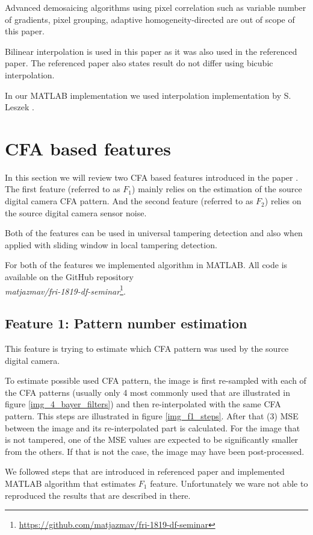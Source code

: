 \documentclass{template/acm_proc_article-sp}
\begin{document}
Advanced demosaicing algorithms using pixel correlation such as 
variable number of gradients, pixel grouping, adaptive homogeneity-directed
are out of scope of this paper.

Bilinear interpolation is used in this paper as it was also used in
the referenced paper. The referenced paper also states result do not
differ using bicubic interpolation.

In our MATLAB implementation we used interpolation implementation by S. Leszek \cite{cfainterpolation2009}.

\newpage
\section{CFA based features}
In this section we will review two CFA based features introduced in the paper \cite{dirik2009image}. The first feature (referred to as  $F_1$) mainly relies on the estimation of the source digital camera CFA pattern. And the second feature (referred to as $F_2$) relies on the source digital camera sensor noise.

Both of the features can be used in universal tampering detection and also when applied with sliding window in local tampering detection.

For both of the features we implemented algorithm in MATLAB. All code is available on the GitHub repository\\\textit{matjazmav/fri-1819-df-seminar}\footnote{\url{https://github.com/matjazmav/fri-1819-df-seminar}}.

\subsection{Feature 1: Pattern number estimation}
This feature is trying to estimate which CFA pattern was used by the source digital camera.

To estimate possible used CFA pattern, the image is first re-sampled with each of the CFA patterns (usually only 4 most commonly used that are illustrated in figure \ref{img_4_bayer_filters}) and then re-interpolated with the same CFA pattern. This steps are illustrated in figure \ref{img_f1_steps}. After that (3) MSE between the image and its re-interpolated part is calculated. For the image that is not tampered, one of the MSE values are expected to be significantly smaller from the others. If that is not the case, the image may have been post-processed.

We followed steps that are introduced in referenced paper and implemented MATLAB algorithm that estimates $F_1$ feature. Unfortunately we ware not able to reproduced the results that are described in there.
\end{document}
